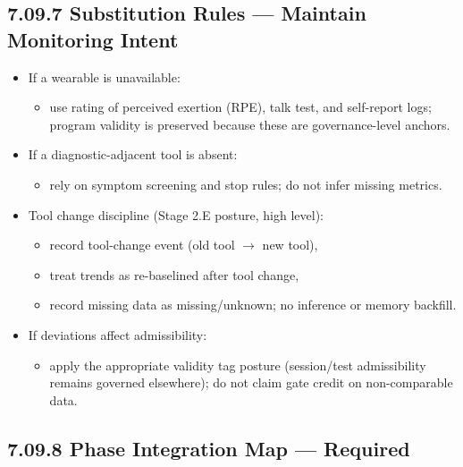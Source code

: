 \documentclass[10pt]{article}
\begin{document}
\subsection*{7.09.7 Substitution Rules — Maintain Monitoring Intent}
{}

\begin{itemize}
\item If a wearable is unavailable:
  \begin{itemize}
  \item use rating of perceived exertion (RPE), talk test, and self-report logs; program validity is preserved because these are governance-level anchors.
  \end{itemize}
\item If a diagnostic-adjacent tool is absent:
  \begin{itemize}
  \item rely on symptom screening and stop rules; do not infer missing metrics.
  \end{itemize}
\item Tool change discipline (Stage 2.E posture, high level):
  \begin{itemize}
  \item record tool-change event (old tool $\rightarrow$ new tool),
  \item treat trends as re-baselined after tool change,
  \item record missing data as missing/unknown; no inference or memory backfill.
  \end{itemize}
\item If deviations affect admissibility:
  \begin{itemize}
  \item apply the appropriate validity tag posture (session/test admissibility remains governed elsewhere); do not claim gate credit on non-comparable data.
  \end{itemize}
\end{itemize}

\subsection*{7.09.8 Phase Integration Map — Required}
{}

\begingroup
\scriptsize
\setlength{\tabcolsep}{2pt}
\renewcommand{\arraystretch}{1.12}
\end{document}
